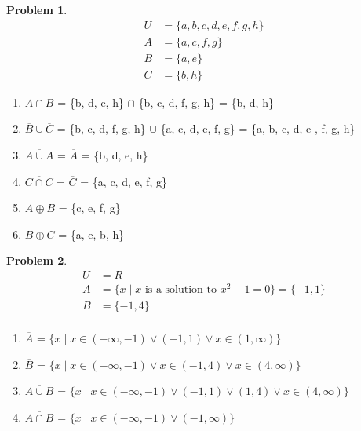 \documentclass{article}
\theoremstyle{definition}
\newtheorem{problem}{Problem}[section]
\begin{document}
\begin{problem}
\[
    \begin{aligned}
        U &= \{a, b, c, d, e, f, g, h\}\\
        A &= \{a, c, f, g\}\\
        B &= \{a, e\}\\
        C &= \{b, h\}
    \end{aligned}
\]
    \begin{enumerate}[label=(\alph*)]
        Compute

        \item \(\overline{A} \cap \overline{B}\) = \{b, d, e, h\} $\cap$ \{b, c, d, f, g, h\} = \{b, d, h\}
        \item \(\overline{B} \cup \overline{C}\) = \{b, c, d, f, g, h\} $\cup$ \{a, c, d, e, f, g\} = \{a, b, c, d, e
        , f, g, h\}
        \item \(\overline{A \cup A}\) = $\overline{A}$ = \{b, d, e, h\}
        \item \(\overline{C \cap C}\) = $\overline{C}$ = \{a, c, d, e, f, g\}
        \item \(A \oplus B\) = \{c, e, f, g\}
        \item \(B \oplus C\) = \{a, e, b, h\}

    \end{enumerate}
\end{problem}

\begin{problem}
\[
    \begin{aligned}
        U &= R\\
        A &= \{x \mid x \text{ is a solution to } x^2 -1 = 0\} = \{-1, 1\}\\
        B &= \{-1, 4\}\\
    \end{aligned}
\]
    \begin{enumerate}[label=(\alph*)]
        Compute

        \item \(\overline{A}\) = $\{x \mid x \in (-\infty, -1) \lor (-1, 1) \lor x \in (1, \infty)\}$
        \item \(\overline{B}\) = $\{x \mid x \in (-\infty, -1) \lor x \in (-1, 4) \lor x \in (4, \infty)\}$
        \item \(\overline{A \cup B}\) = $\{x \mid x \in (-\infty, -1) \lor (-1, 1) \lor (1, 4) \lor x \in (4, \infty)\}$
        \item \(\overline{A \cap B}\) = $\{x \mid x \in (-\infty, -1) \lor (-1, \infty)\}$

    \end{enumerate}
\end{problem}
\end{document}
